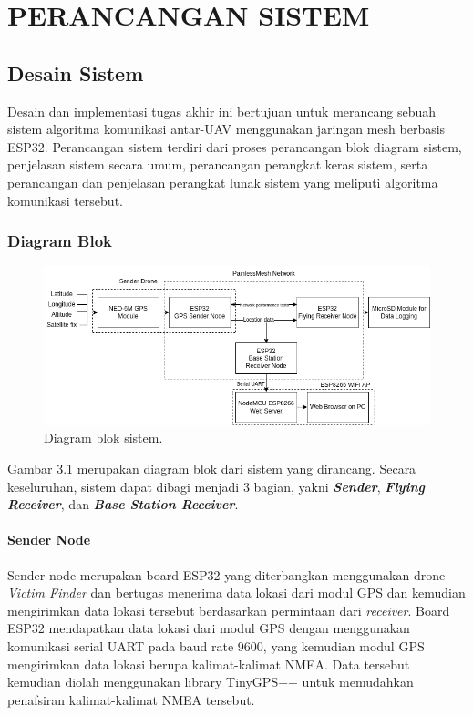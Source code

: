 \chapter{PERANCANGAN SISTEM}

\section{Desain Sistem}
Desain dan implementasi tugas akhir ini bertujuan untuk merancang sebuah sistem algoritma komunikasi antar-UAV menggunakan jaringan mesh berbasis ESP32. Perancangan sistem terdiri dari proses perancangan blok diagram sistem, penjelasan sistem secara umum, perancangan perangkat keras sistem, serta perancangan dan penjelasan perangkat lunak sistem yang meliputi algoritma komunikasi tersebut.

\subsection{Diagram Blok}
\begin{figure}[H]
	\centering
	\includegraphics[scale=0.5]{./assets/DiagramBlokTANew}
	\caption{Diagram blok sistem.}
\end{figure}

Gambar 3.1 merupakan diagram blok dari sistem yang dirancang. Secara keseluruhan, sistem dapat dibagi menjadi 3 bagian, yakni \textbf{\textit{Sender}}, \textbf{\textit{Flying Receiver}}, dan \textbf{\textit{Base Station Receiver}}.
\subsubsection{Sender Node}
Sender node merupakan board ESP32 yang diterbangkan menggunakan drone \textit{Victim Finder} dan bertugas menerima data lokasi dari modul GPS dan kemudian mengirimkan data lokasi tersebut berdasarkan permintaan dari \textit{receiver}. Board ESP32 mendapatkan data lokasi dari modul GPS dengan menggunakan komunikasi serial UART pada baud rate 9600, yang kemudian modul GPS mengirimkan data lokasi berupa kalimat-kalimat NMEA. Data tersebut kemudian diolah menggunakan library TinyGPS++ untuk memudahkan penafsiran kalimat-kalimat NMEA tersebut.


